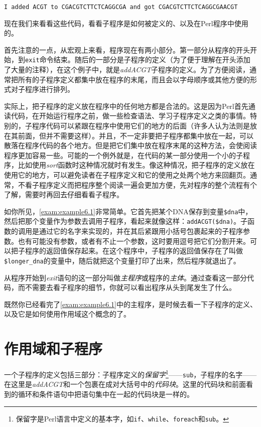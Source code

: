 \begin{lstlisting}
I added ACGT to CGACGTCTTCTCAGGCGA and got CGACGTCTTCTCAGGCGAACGT
\end{lstlisting}

现在我们来看看这些代码，看看子程序是如何被定义的、以及在Perl程序中使用的。

首先注意的一点，从宏观上来看，程序现在有两小部分。第一部分从程序的开头开始，到\verb|exit|命令结束。随后的一部分是子程序的定义（为了便于理解在开头添加了大量的注释），在这个例子中，就是\textit{addACGT}子程序的定义。为了方便阅读，通常把所有的子程序定义都集中放在程序的末尾，而且会以字母顺序或其他方便的形式对子程序进行排列。

实际上，把子程序的定义放在程序中的任何地方都是合法的。这是因为Perl首先通读代码，在开始运行程序之前，做一些检查语法、学习子程序定义之类的事情。特别的，子程序代码可以紧跟在程序中使用它们的地方的后面（许多人认为法则是放在其前面，但并不需要这样）。并且，不一定非要把子程序都集中放在一起，可以散落在程序代码的各个地方。但是把它们集中放在程序末尾的这种方法，会使阅读程序更加容易一些。可能的一个例外就是，在代码的某一部分使用一个小的子程序，比如使用\textit{sort}函数时这种情况就时有发生。像这种情况，把子程序的定义放在使用它的地方，可以避免读者在子程序定义和它的使用之处两个地方来回翻页。通常，不看子程序定义而把程序整个阅读一遍会更加方便，先对程序的整个流程有个了解，需要时再回去仔细看看子程序。

如你所见，\autoref{exam:example6.1}非常简单。它首先把某个DNA保存到变量\verb|$dna|中，然后把那个变量作为参数去调用子程序，看起来就像这样：\verb|addACGT($dna)|。子函数的调用是通过它的名字来实现的，并在其后紧跟用小括号包裹起来的子程序参数。也有可能没有参数，或者有不止一个参数，这时要用逗号把它们分割开来。可以把子程序的返回值保存起来。在这个程序中，子程序的返回值保存在了叫做\verb|$longer_dna|的变量中，随后就把这个变量打印了出来，然后程序就退出了。

从程序开始到\textit{exit}语句的这一部分叫做\textit{主程序}或程序的\textit{主体}。通过查看这一部分代码，而不需要去看子程序的细节，你就可以看出程序从头到尾发生了什么。

既然你已经看完了\autoref{exam:example6.1}中的主程序，是时候去看一下子程序的定义、以及它是如何使用作用域这个概念的了。

\section{作用域和子程序}
一个子程序的定义包括三部分：子程序定义的\textit{保留字}\footnote{保留字是Perl语言中定义的基本字，如\verb|if|、\verb|while|、\verb|foreach|和\verb|sub|。}——\verb|sub|，子程序的名字——在这里是\textit{addACGT}和一个包裹在成对大括号中的\textit{代码块}。这里的代码块和前面看到的循环和条件语句中把语句集中在一起的代码块是一样的。

